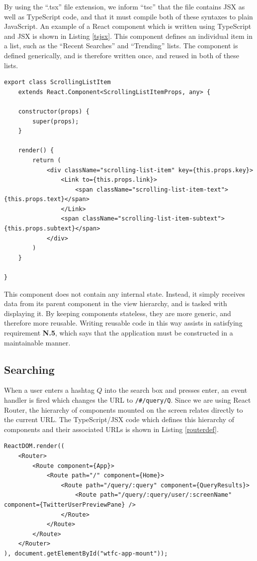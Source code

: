 \documentclass{l4proj}
\newcommand{\code}[1]{\texttt{#1}}
\begin{document}
By using the ``.tsx'' file extension, we inform ``tsc'' that the file contains JSX as well as TypeScript code, and that it must compile both of these syntaxes to plain JavaScript. An example of a React component which is written using TypeScript and JSX is shown in Listing \ref{tsjsx}. This component defines an individual item in a list, such as the ``Recent Searches'' and ``Trending'' lists. The component is defined generically, and is therefore written once, and reused in both of these lists.

\begin{lstlisting}[caption={Definition of a reusable list-item component using React, JSX, and TypeScript},label=tsjsx]
export class ScrollingListItem 
    extends React.Component<ScrollingListItemProps, any> {

    constructor(props) {
        super(props);
    }

    render() {
        return (
            <div className="scrolling-list-item" key={this.props.key}>
                <Link to={this.props.link}>
                    <span className="scrolling-list-item-text">{this.props.text}</span>
                </Link>
                <span className="scrolling-list-item-subtext">{this.props.subtext}</span>
            </div>
        )
    }

}
\end{lstlisting}

This component does not contain any internal state. Instead, it simply receives data from its parent component in the view hierarchy, and is tasked with displaying it. By keeping components stateless, they are more generic, and therefore more reusable. Writing reusable code in this way assists in satisfying requirement \textbf{N.5}, which says that the application must be constructed in a maintainable manner.

        \subsection{Searching}
        When a user enters a hashtag $Q$ into the search box and presses enter, an event handler is fired which changes the URL to \code{/\#/query/Q}. Since we are using React Router, the hierarchy of components mounted on the screen relates directly to the current URL. The TypeScript/JSX code which defines this hierarchy of components and their associated URLs is shown in Listing \ref{routerdef}.
        
\begin{lstlisting}[caption=Definition of the hierarchy of React component and how they map to the URL.,label=routerdef]
ReactDOM.render((
    <Router>
        <Route component={App}>
            <Route path="/" component={Home}>
                <Route path="/query/:query" component={QueryResults}>
                    <Route path="/query/:query/user/:screenName" component={TwitterUserPreviewPane} />
                </Route>
            </Route>
        </Route>
    </Router>
), document.getElementById("wtfc-app-mount"));
\end{lstlisting}
         
\end{document}
